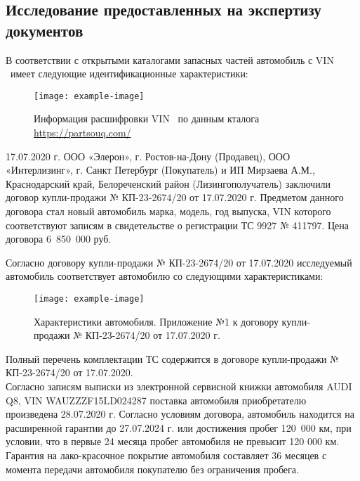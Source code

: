 \subsection{Исследование предоставленных на экспертизу документов}
%

В соответствии с открытыми каталогами запасных частей  автомобиль с VIN \vin \ имеет следующие идентификационные характеристики:

\begin{figure}[H]
	\centering
	\texttt{[image: example-image]}
	\caption{Информация расшифровки VIN \vin \ по данным кталога \url{https://partsouq.com/}}
	\label{vin}
\end{figure}
%
17.07.2020 г. ООО «Элерон», г. Ростов-на-Дону (Продавец), ООО «Интерлизинг», г. Санкт Петербург (Покупатель) и ИП Мирзаева А.М., Краснодарский край, Белореченский район (Лизингополучатель) заключили договор купли-продажи № КП-23-2674/20 от 17.07.2020 г. Предметом данного договора стал новый автомобиль марка, модель, год выпуска, VIN которого соответствуют записям в свидетельстве о регистрации ТС 9927 № 411797. Цена договора 6 850 000 руб.

Согласно договору купли-продажи № КП-23-2674/20 от 17.07.2020 исследуемый автомобиль  соответствует  автомобилю со следующими характеристиками:\\

\begin{figure}[H]
	\centering
	\texttt{[image: example-image]}
	\caption{Характеристики автомобиля.  Приложение №1 к договору купли-продажи № КП-23-2674/20 от 17.07.2020 г.}
	\label{vin}
\end{figure}

Полный перечень комплектации ТС содержится в договоре купли-продажи № КП-23-2674/20 от 17.07.2020.\\
Согласно  записям  выписки из электронной сервисной книжки автомобиля AUDI Q8, VIN  WAUZZZF15LD024287 поставка автомобиля приобретателю произведена   28.07.2020 г. Согласно условиям договора, автомобиль находится на расширенной гарантии до 27.07.2024 г. или достижения  пробег 120 000 км, при условии, что в первые 24 месяца пробег автомобиля не превысит 120 000 км. Гарантия на лако-красочное покрытие автомобиля составляет 36 месяцев с момента передачи автомобиля покупателю без ограничения пробега.\\[3mm]

